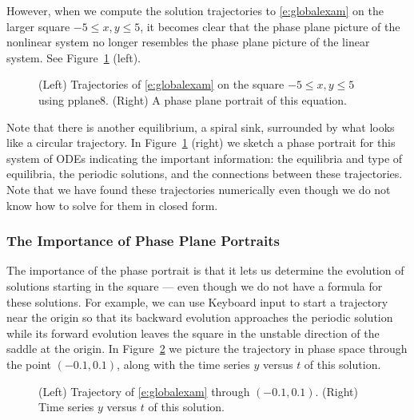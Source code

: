 \documentclass{ximera}
\begin{document}
However, when we compute the solution trajectories to
\eqref{e:globalexam} on the larger square $-5\leq x,y\leq 5$, it
becomes clear that the phase plane picture of 
the nonlinear
system no longer resembles the phase plane picture of the linear
system.  See Figure~\ref{F:globalb} (left).
\begin{figure}[htb]
           \centerline{%
           }
           \caption{(Left) Trajectories of \protect\eqref{e:globalexam} 
on the square $-5\leq x,y \leq 5$ using {\sf pplane8}. (Right) A
phase plane portrait of this equation.}
           \label{F:globalb}
\end{figure}
Note that there is another equilibrium, a spiral sink,
surrounded by what looks like a circular trajectory.  In 
Figure~\ref{F:globalb} (right) we sketch a phase portrait for 
this system of ODEs indicating the important information: 
the equilibria and type of equilibria, the periodic solutions,
and the connections between these trajectories.  Note that we have found
these trajectories numerically even though we do not know how to solve for
them in closed form.

\subsubsection*{The Importance of Phase Plane Portraits}

The importance of the phase portrait is that it lets us determine the 
evolution of solutions starting in the square --- even though we do not 
have a formula for these solutions.  For example, we can use 
{\sf Keyboard input} to start a trajectory near the origin so
that its backward evolution
approaches the periodic solution
while its forward evolution leaves the square in the unstable
direction of the saddle at 
the origin.  In Figure~\ref{F:nltraj}
we picture the trajectory in phase space through the point 
$(-0.1,0.1)$, along with the time series $y$ versus $t$ of this
solution.  

\begin{figure}[htb]
           \centerline{%
           }
           \caption{(Left) Trajectory of \protect\eqref{e:globalexam} 
	through $(-0.1,0.1)$. (Right) Time series $y$ versus $t$ of
this solution.}
           \label{F:nltraj}
\end{figure}
\end{document}
